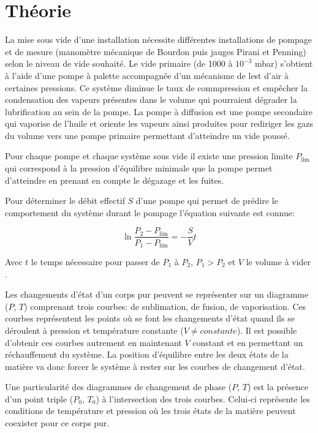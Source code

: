 \section{Théorie}

La mise sous vide d'une installation nécessite différentes installations de pompage et de mesure (manomètre mécanique de Bourdon puis jauges Pirani et Penning) selon le niveau de vide souhaité. Le vide primaire (de 1000 à \(10^{-3}\) \si{\milli \bar}) s'obtient à l'aide d'une pompe à palette accompagnée d'un mécanisme de lest d'air à certaines pressions. Ce système diminue le taux de commpression et empêcher la condensation des vapeurs présentes dans le volume qui pourraient dégrader la lubrification au sein de la pompe. La pompe à diffusion est une pompe secondaire qui vaporise de l'huile et oriente les vapeurs ainsi produites pour rediriger les gazs du volume vers une pompe primaire permettant d'atteindre un vide poussé.

Pour chaque pompe et chaque système sous vide il existe une pression limite \(P_\textrm{lim}\) qui correspond à la pression d'équilibre minimale que la pompe permet d'atteindre en prenant en compte le dégazage et les fuites.

Pour déterminer le débit effectif \(S\) d'une pompe qui permet de prédire le comportement du système durant le pompage l'équation suivante est connue:

\begin{equation}
    \ln\frac{P_\textrm{2} - P_\textrm{lim}}{P_\textrm{1} - P_\textrm{lim}} = -\frac{S}{V}t
    \label{eq:cinetique}
\end{equation}

Avec \(t\) le temps nécessaire pour passer de \(P_\textrm{1}\) à \(P_\textrm{2}\), \(P_\textrm{1} > P_\textrm{2}\) et \(V\) le volume à vider \cite{notice}.

Les changements d'état d'un corps pur peuvent se représenter sur un diagramme (\(P\), \(T\)) comprenant trois courbes: de sublimation, de fusion, de vaporisation. Ces courbes représentent les points où se font les changements d'état quand ils se déroulent à pression et température constante (\(V \neq constante\)). Il est possible d'obtenir ces courbes autrement en maintenant \(V\) constant et en permettant un réchauffement du système. La position d'équilibre entre les deux états de la matière va donc forcer le système à rester sur les courbes de changement d'état.

Une particularité des diagrammes de changement de phase (\(P\), \(T\)) est la présence d'un point triple (\(P_\textrm{0}\), \(T_\textrm{0}\)) à l'intersection des trois courbes. Celui-ci représente les conditions de température et pression où les trois états de la matière peuvent coexister pour ce corps pur.


